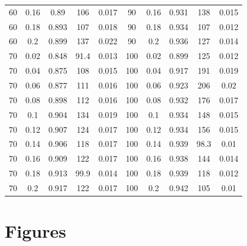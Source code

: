 \documentclass[12pt]{article}
\begin{document}
\begin{table}[ht!]
\begin{tabular}{c c | c | c c ||c c | c | c c |}
			60	&	0.16	&	0.89	&	106	&	0.017	&	90	&	0.16	&	0.931	&	138	&	0.015	\\
			60	&	0.18	&	0.893	&	107	&	0.018	&	90	&	0.18	&	0.934	&	107	&	0.012	\\
			60	&	0.2	&	0.899	&	137	&	0.022	&	90	&	0.2	&	0.936	&	127	&	0.014	\\
			70	&	0.02	&	0.848	&	91.4	&	0.013	&	100	&	0.02	&	0.899	&	125	&	0.012	\\
			70	&	0.04	&	0.875	&	108	&	0.015	&	100	&	0.04	&	0.917	&	191	&	0.019	\\
			70	&	0.06	&	0.877	&	111	&	0.016	&	100	&	0.06	&	0.923	&	206	&	0.02	\\
			70	&	0.08	&	0.898	&	112	&	0.016	&	100	&	0.08	&	0.932	&	176	&	0.017	\\
			70	&	0.1	&	0.904	&	134	&	0.019	&	100	&	0.1	&	0.934	&	148	&	0.015	\\
			70	&	0.12	&	0.907	&	124	&	0.017	&	100	&	0.12	&	0.934	&	156	&	0.015	\\
			70	&	0.14	&	0.906	&	118	&	0.017	&	100	&	0.14	&	0.939	&	98.3	&	0.01	\\
			70	&	0.16	&	0.909	&	122	&	0.017	&	100	&	0.16	&	0.938	&	144	&	0.014	\\
			70	&	0.18	&	0.913	&	99.9	&	0.014	&	100	&	0.18	&	0.939	&	118	&	0.012	\\
			70	&	0.2	&	0.917	&	122	&	0.017	&	100	&	0.2	&	0.942	&	105	&	0.01	\\
			\hline
		\end{tabular}
		\end{table}


\section{Figures}

\end{document}
